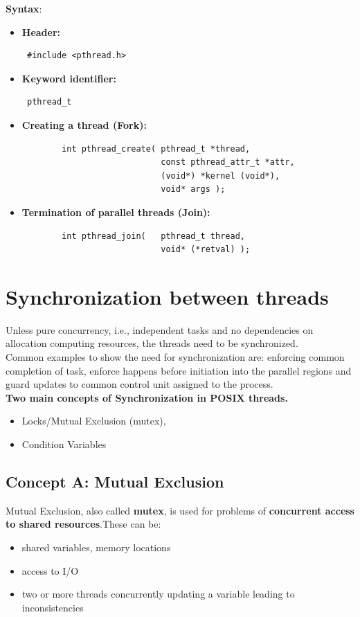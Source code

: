 \documentclass[12pt, a4paper]{report}
\begin{document}
{\bfseries{Syntax}}:
\begin{itemize}
    \item {\bfseries{Header:}} \begin{verbatim} #include <pthread.h> \end{verbatim}
    \item {\bfseries{Keyword identifier:}} \begin{verbatim} pthread_t \end{verbatim}
    \item {\bfseries{Creating a thread (Fork):}}   
    \begin{verbatim} 
        int pthread_create( pthread_t *thread,
                            const pthread_attr_t *attr,
                            (void*) *kernel (void*),
                            void* args );
    \end{verbatim}
    \item {\bfseries{Termination of parallel threads (Join):}}
    \begin{verbatim}
        int pthread_join(   pthread_t thread,
                            void* (*retval) );
    \end{verbatim}
\end{itemize}

\section{Synchronization between threads}
Unless pure concurrency, i.e., independent tasks and no dependencies on allocation computing resources, the threads need to be 
synchronized.\\
Common examples to show the need for synchronization are: enforcing common completion of task, enforce happens before initiation 
into the parallel regions and guard updates to common control unit assigned to the process. \\
{\bfseries{Two main concepts of Synchronization in POSIX threads.}} 
\begin{itemize}
    \item Locks/Mutual Exclusion (mutex), 
    \item Condition Variables
\end{itemize}

\subsection*{Concept A: Mutual Exclusion}
Mutual Exclusion, also called {\bfseries{mutex}}, is used for problems of {\bfseries{concurrent access to shared resources}}.These
can be:
\begin{itemize}
    \item shared variables, memory locations
    \item access to I/O
    \item two or more threads concurrently updating a variable leading to inconsistencies
\end{itemize}
\end{document}
